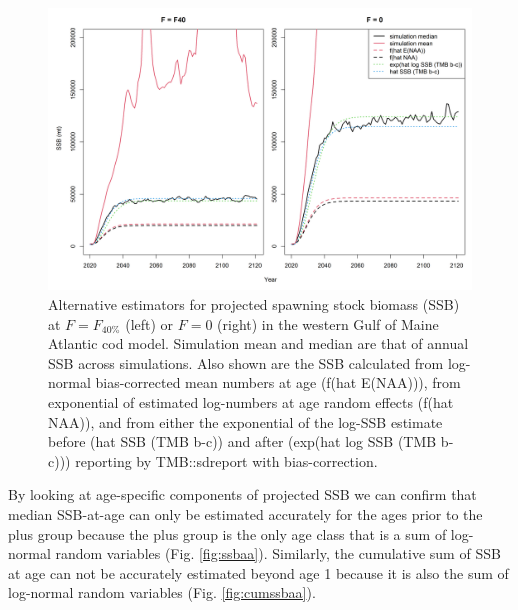 \documentclass[
]{article}
\begin{document}
\begin{figure}

{\centering \includegraphics[width=1\linewidth]{compare_ssb} 

}

\caption{Alternative estimators for projected spawning stock biomass (SSB) at $F=F_{40\%}$ (left) or $F=0$ (right) in the western Gulf of Maine Atlantic cod model. Simulation mean and median are that of annual SSB across simulations. Also shown are the SSB calculated from log-normal bias-corrected mean numbers at age (f(hat E(NAA))), from exponential of estimated log-numbers at age random effects (f(hat NAA)), and from either the exponential of the log-SSB estimate before (hat SSB (TMB b-c)) and after (exp(hat log SSB (TMB b-c))) reporting by TMB::sdreport with bias-correction.}\label{fig:ssb}
\end{figure}

By looking at age-specific components of projected SSB we can confirm that median SSB-at-age can only be estimated accurately for the ages prior to the plus group because the plus group is the only age class that is a sum of log-normal random variables (Fig. \ref{fig:ssbaa}). Similarly, the cumulative sum of SSB at age can not be accurately estimated beyond age 1 because it is also the sum of log-normal random variables (Fig. \ref{fig:cumssbaa}).
\end{document}

